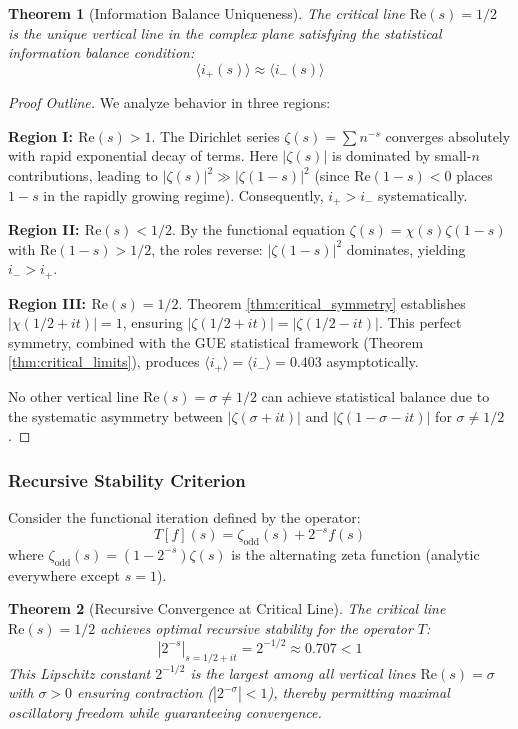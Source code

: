 \documentclass[12pt]{article}
\theoremstyle{plain}
\newtheorem{theorem}{Theorem}[section]
\theoremstyle{definition}
\begin{document}
\begin{theorem}[Information Balance Uniqueness]\label{thm:balance_uniqueness}
The critical line $\text{Re}(s) = 1/2$ is the unique vertical line in the complex plane satisfying the statistical information balance condition:
\begin{equation}
\langle i_+(s) \rangle \approx \langle i_-(s) \rangle
\end{equation}
\end{theorem}

\begin{proof}[Proof Outline]
We analyze behavior in three regions:

\textbf{Region I: $\text{Re}(s) > 1$}. The Dirichlet series $\zeta(s) = \sum n^{-s}$ converges absolutely with rapid exponential decay of terms. Here $|\zeta(s)|$ is dominated by small-$n$ contributions, leading to $|\zeta(s)|^2 \gg |\zeta(1-s)|^2$ (since $\text{Re}(1-s) < 0$ places $1-s$ in the rapidly growing regime). Consequently, $i_+ > i_-$ systematically.

\textbf{Region II: $\text{Re}(s) < 1/2$}. By the functional equation $\zeta(s) = \chi(s)\zeta(1-s)$ with $\text{Re}(1-s) > 1/2$, the roles reverse: $|\zeta(1-s)|^2$ dominates, yielding $i_- > i_+$.

\textbf{Region III: $\text{Re}(s) = 1/2$}. Theorem \ref{thm:critical_symmetry} establishes $|\chi(1/2+it)| = 1$, ensuring $|\zeta(1/2+it)| = |\zeta(1/2-it)|$. This perfect symmetry, combined with the GUE statistical framework (Theorem \ref{thm:critical_limits}), produces $\langle i_+ \rangle = \langle i_- \rangle = 0.403$ asymptotically.

No other vertical line $\text{Re}(s) = \sigma \neq 1/2$ can achieve statistical balance due to the systematic asymmetry between $|\zeta(\sigma+it)|$ and $|\zeta(1-\sigma-it)|$ for $\sigma \neq 1/2$.
\end{proof}

\subsubsection{Recursive Stability Criterion}

Consider the functional iteration defined by the operator:
$$T[f](s) = \zeta_{\text{odd}}(s) + 2^{-s} f(s)$$
where $\zeta_{\text{odd}}(s) = (1 - 2^{-s})\zeta(s)$ is the alternating zeta function (analytic everywhere except $s=1$).

\begin{theorem}[Recursive Convergence at Critical Line]\label{thm:recursive_convergence}
The critical line $\text{Re}(s) = 1/2$ achieves optimal recursive stability for the operator $T$:
\begin{equation}
|2^{-s}|_{s=1/2+it} = 2^{-1/2} \approx 0.707 < 1
\end{equation}
This Lipschitz constant $2^{-1/2}$ is the \emph{largest} among all vertical lines $\text{Re}(s) = \sigma$ with $\sigma > 0$ ensuring contraction ($|2^{-\sigma}| < 1$), thereby permitting maximal oscillatory freedom while guaranteeing convergence.
\end{theorem}
\end{document}
